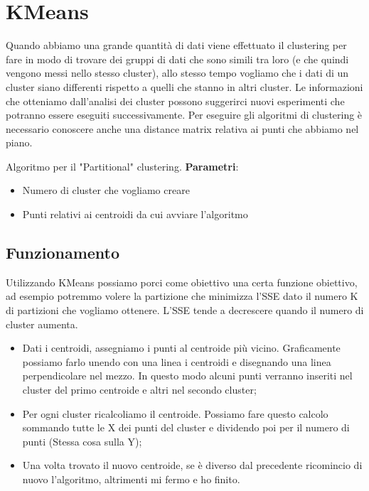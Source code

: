 \documentclass[14pt]{extreport}
\begin{document}
\chapter{KMeans}

Quando abbiamo una grande quantità di dati viene effettuato il clustering per fare in modo di trovare dei gruppi di dati che sono simili tra loro (e che quindi vengono messi nello stesso cluster), allo stesso tempo vogliamo che i dati di un cluster siano differenti rispetto a quelli che stanno in altri cluster.
Le informazioni che otteniamo dall'analisi dei cluster possono suggerirci nuovi esperimenti che potranno essere eseguiti successivamente.
Per eseguire gli algoritmi di clustering è necessario conoscere anche una distance matrix relativa ai punti che abbiamo nel piano.

Algoritmo per il "Partitional" clustering.
\newline
\newline
{\bf Parametri}:

\begin{itemize}
    \item Numero di cluster che vogliamo creare
    \item Punti relativi ai centroidi da cui avviare l'algoritmo
\end{itemize}


\section{Funzionamento}

Utilizzando KMeans possiamo porci come obiettivo una certa funzione obiettivo, ad esempio potremmo volere la partizione che minimizza l'SSE dato il numero K di partizioni che vogliamo ottenere.
L'SSE tende a decrescere quando il numero di cluster aumenta.

\begin{itemize}
    \item Dati i centroidi, assegniamo i punti al centroide più vicino. Graficamente possiamo farlo unendo con una linea i centroidi e disegnando una linea perpendicolare nel mezzo. In questo modo alcuni punti verranno inseriti nel cluster del primo centroide e altri nel secondo cluster;
    \item Per ogni cluster ricalcoliamo il centroide. Possiamo fare questo calcolo sommando tutte le X dei punti del cluster e dividendo poi per il numero di punti (Stessa cosa sulla Y);
    \item Una volta trovato il nuovo centroide, se è diverso dal precedente ricomincio di nuovo l'algoritmo, altrimenti mi fermo e ho finito.
\end{itemize}
\end{document}
